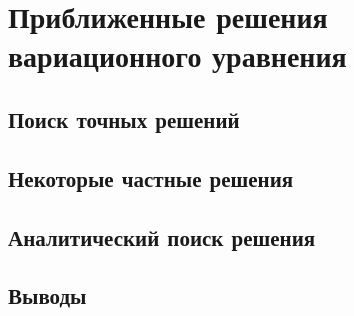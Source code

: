 
\chapter{Приближенные решения вариационного уравнения}

\section{Поиск точных решений}

\section{Некоторые частные решения}

\section{Аналитический поиск решения}

\section{Выводы}